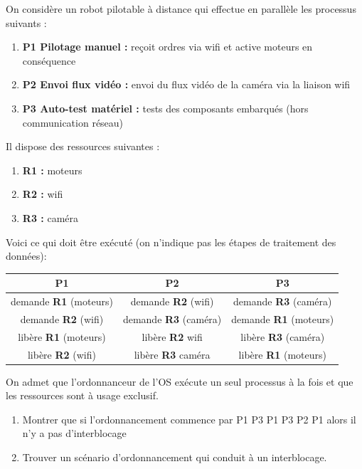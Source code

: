 \documentclass[a4paper,12pt,french]{book}
\begin{document}
\begin{exercice}[]
On considère un robot pilotable à distance qui effectue en parallèle les processus suivants :
\begin{enumerate}[--]
	\item 	\textbf{P1  Pilotage manuel : } reçoit ordres via wifi et active moteurs en conséquence
	\item 	\textbf{P2  Envoi flux vidéo : } envoi du flux vidéo de la caméra via la liaison wifi
    \item 	\textbf{P3  Auto-test matériel : } tests des composants embarqués (hors communication réseau)
\end{enumerate}
Il dispose des ressources suivantes :
\begin{enumerate}[--]
	\item 	\textbf{R1 : }  moteurs
	\item 	\textbf{R2 : }  wifi
    \item 	\textbf{R3 : }	caméra
\end{enumerate}
Voici ce qui doit être exécuté (on n'indique pas les étapes de traitement des données):

\begin{center}
\begin{tabular}{|c|c|c|}
\hline
\rowcolor{UGLiOrange} \textbf{\color{white}P1 }& \textbf{\color{white}P2} & \textbf{\color{white}P3} \\
\hline
demande \textbf{R1} (moteurs) & demande \textbf{R2} (wifi) & demande \textbf{R3} (caméra) \\
\hline
demande \textbf{R2} (wifi) & demande \textbf{R3} (caméra) &  demande \textbf{R1} (moteurs) \\
\hline
libère \textbf{R1} (moteurs) & libère \textbf{R2} wifi & libère \textbf{R3} (caméra)  \\
\hline
libère \textbf{R2} (wifi) & libère \textbf{R3} caméra & libère \textbf{R1} (moteurs)  \\
\hline
\end{tabular}
\end{center}
On admet que l'ordonnanceur de l'OS exécute un seul processus à la fois et que les ressources sont à usage exclusif.
\begin{enumerate}
	\item 	Montrer que si l'ordonnancement commence par  P1 P3 P1 P3 P2 P1 alors il n'y a pas d'interblocage
	\item 	Trouver un scénario d'ordonnancement qui conduit à un interblocage.
\end{enumerate}
\end{exercice}
\end{document}
